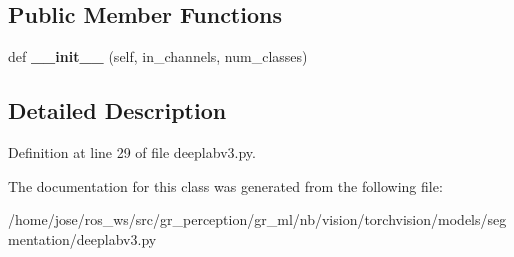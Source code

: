 \subsection*{Public Member Functions}
\begin{DoxyCompactItemize}
\item 
\mbox{\label{classtorchvision_1_1models_1_1segmentation_1_1deeplabv3_1_1DeepLabHead_a92f5bb52fb53c52f94de22ab5b05d3ae}} 
def {\bfseries \+\_\+\+\_\+init\+\_\+\+\_\+} (self, in\+\_\+channels, num\+\_\+classes)
\end{DoxyCompactItemize}


\subsection{Detailed Description}


Definition at line 29 of file deeplabv3.\+py.



The documentation for this class was generated from the following file\+:\begin{DoxyCompactItemize}
\item 
/home/jose/ros\+\_\+ws/src/gr\+\_\+perception/gr\+\_\+ml/nb/vision/torchvision/models/segmentation/deeplabv3.\+py\end{DoxyCompactItemize}
